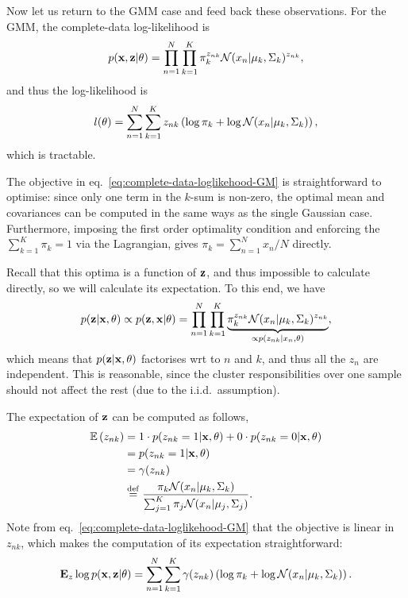 Now let us return to the GMM case and feed back these observations. For the GMM, the complete-data log-likelihood is
\begin{equation}
    p({ \mathbf{x}},{ \mathbf{z}}|\theta) = \prod_{n=1}^{N}\prod_{k=1}^{K} \pi_k^{z_{nk}}{\mathcal N}(x_n|\mu_k,\Sigma_k)^{z_{nk}},
\end{equation}
and thus the log-likelihood is
\begin{equation}
    l(\theta) = \sum_{n=1}^{N}\sum_{k=1}^{K} z_{nk} \left(\log \pi_k + \log {\mathcal N}(x_n|\mu_k,\Sigma_k)\right), \label{eq:complete-data-loglikehood-GM}
\end{equation}
which is tractable. 

\begin{remark}
    The objective in eq.~\eqref{eq:complete-data-loglikehood-GM} is straightforward to optimise: since only one term in the $k$-sum is non-zero, the optimal mean and covariances can be computed in the same ways as the single Gaussian case. Furthermore, imposing the first order optimality condition and enforcing the $\sum_{k=1}^K\pi_k = 1$ via the Lagrangian, gives $\pi_k = \sum_{n=1}^N x_n/N$ directly.
\end{remark}


Recall that this optima is a function of ${ \mathbf{z}}$, and thus impossible to calculate directly, so we will calculate its expectation. To this end, we have
\begin{equation}
    p({ \mathbf{z}}|{ \mathbf{x}},\theta) \propto p({ \mathbf{z}},{ \mathbf{x}}|\theta) = \prod_{n=1}^{N}\prod_{k=1}^{K} \underbrace{\pi_k^{z_{nk}}{\mathcal N}(x_n|\mu_k,\Sigma_k)^{z_{nk}}}_{\propto p(z_{nk}|x_n,\theta)},
\end{equation}
which means that $ p({ \mathbf{z}}|{ \mathbf{x}},\theta) $ factorises wrt to $n$ and $k$, and thus all the $z_n$ are independent. This is reasonable, since the cluster responsibilities over one sample should not affect the rest (due to the i.i.d.~assumption).

The expectation of ${ \mathbf{z}}$ can be computed as follows, 
\begin{align}
    \mathbb{E} \left(z_{nk}\right) 
    &= 1\cdot p(z_{nk} = 1 | { \mathbf{x}},\theta) + 0\cdot p(z_{nk} = 0 | { \mathbf{x}},\theta)\\
    &=  p(z_{nk} = 1 | { \mathbf{x}},\theta)\\
    &=  \gamma(z_{nk})\\
    &\mathrel{\stackrel{\mathrm{def}}{=}} \frac{\pi_k {\mathcal N}(x_n|\mu_k,\Sigma_k)}{\sum_{j=1}^{K}\pi_j {\mathcal N}(x_n|\mu_j,\Sigma_j)}.
\end{align}
Note from eq.~\eqref{eq:complete-data-loglikehood-GM} that the objective is linear in $z_{nk}$, which makes the computation of its expectation straightforward:
\begin{equation}
    \mathbf{E}_z \log p({ \mathbf{x}},{ \mathbf{z}}|\theta) = \sum_{n=1}^{N}\sum_{k=1}^{K} \gamma(z_{nk}) \left(\log \pi_k + \log {\mathcal N}(x_n|\mu_k,\Sigma_k)\right).
\end{equation}

